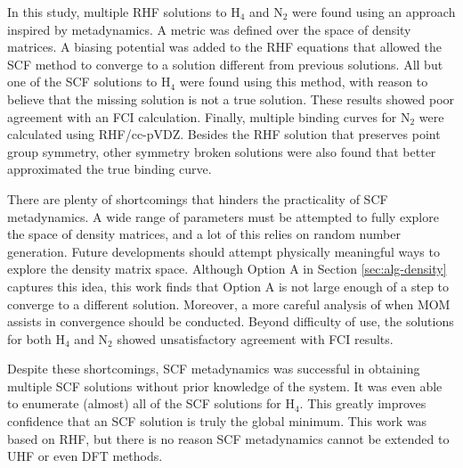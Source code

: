 \documentclass[final,3p,times,twocolumn]{elsarticle}
\begin{document}
In this study, multiple RHF solutions to H$_4$ and N$_2$ were found using an approach inspired by metadynamics. A metric was defined over the space of density matrices. A biasing potential was added to the RHF equations that allowed the SCF method to converge to a solution different from previous solutions. All but one of the SCF solutions to H$_4$ were found using this method, with reason to believe that the missing solution is not a true solution. These results showed poor agreement with an FCI calculation. Finally, multiple binding curves for N$_2$ were calculated using RHF/cc-pVDZ. Besides the RHF solution that preserves point group symmetry, other symmetry broken solutions were also found that better approximated the true binding curve.

There are plenty of shortcomings that hinders the practicality of SCF metadynamics. A wide range of parameters must be attempted to fully explore the space of density matrices, and a lot of this relies on random number generation. Future developments should attempt physically meaningful ways to explore the density matrix space. Although Option A in Section \ref{sec:alg-density} captures this idea, this work finds that Option A is not large enough of a step to converge to a different solution. Moreover, a more careful analysis of when MOM assists in convergence should be conducted. Beyond difficulty of use, the solutions for both H$_4$ and N$_2$ showed unsatisfactory agreement with FCI results.

Despite these shortcomings, SCF metadynamics was successful in obtaining multiple SCF solutions without prior knowledge of the system. It was even able to enumerate (almost) all of the SCF solutions for H$_4$. This greatly improves confidence that an SCF solution is truly the global minimum. This work was based on RHF, but there is no reason SCF metadynamics cannot be extended to UHF or even DFT methods. 

\end{document}
